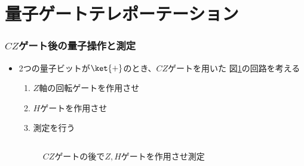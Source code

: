 \section{量子ゲートテレポーテーション}

\begin{frame}
  \frametitle{$CZ$ゲート後の量子操作と測定}

  \pause
  \begin{itemize}
    \item 2つの量子ビットが$\ket{+}$のとき、$CZ$ゲートを用いた
    図\ref{fig:teleportation_circuit}の回路を考える
    \begin{enumerate}
      \item $Z$軸の回転ゲートを作用させ \label{enum:teleportation_1}
      \item $H$ゲートを作用させ \label{enum:teleportation_2}
      \item 測定を行う \label{enum:teleportation_3}
    \end{enumerate}

    \begin{columns}
      \begin{column}{0.6\textwidth}
        \begin{figure}
          \centering
          \caption{$CZ$ゲートの後で$Z, H$ゲートを作用させ測定}
          \label{fig:teleportation_circuit}
        \end{figure}


\end{column}
\end{columns}
\end{itemize}
\end{frame}
